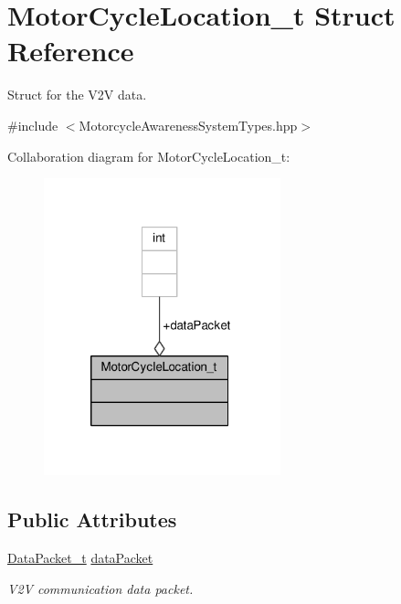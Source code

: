 \hypertarget{structMotorCycleLocation__t}{\section{Motor\-Cycle\-Location\-\_\-t Struct Reference}
\label{structMotorCycleLocation__t}
}


Struct for the V2\-V data.  




{\ttfamily \#include $<$Motorcycle\-Awareness\-System\-Types.\-hpp$>$}



Collaboration diagram for Motor\-Cycle\-Location\-\_\-t\-:\nopagebreak
\begin{figure}[H]
\begin{center}
\leavevmode
\includegraphics[width=194pt]{structMotorCycleLocation__t__coll__graph}
\end{center}
\end{figure}
\subsection*{Public Attributes}
\begin{DoxyCompactItemize}
\item 
\hyperlink{MotorcycleAwarenessSystemTypes_8hpp_ac0eb6e9beb8fa8db296c699fcc8494e6}{Data\-Packet\-\_\-t} \hyperlink{structMotorCycleLocation__t_a1f854587b19dbe91dffd637ce70be62e}{data\-Packet}
\begin{DoxyCompactList}\small\item\em V2\-V communication data packet. \end{DoxyCompactList}\end{DoxyCompactItemize}


